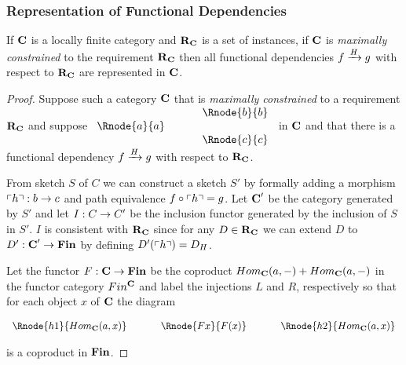 \documentclass[10pt,a4paper]{article}
\theoremstyle{remark}
\renewcommand{\term}[1]{\textit{#1}}  %
\begin{document}
\subsubsection{Representation of Functional Dependencies}
\begin{lemma}
If $\catc$ is a locally finite category and $\reqtc$ is a set of instances, if $\catc$ is 
\term{maximally constrained} to the requirement $\reqtc$ then
all functional dependencies $\fundep{H}{f}{g}$  with respect to $\reqtc$ are represented in $\catc$.
\end{lemma}
\begin{proof}
Suppose such a category  $\catc$  that  is 
\term{maximally constrained} to a requirement $\reqtc$ and suppose
$
\begin{array}{c p{0.5cm} c  }
             &&   \Rnode{b}{b} \\[0.01cm]
\Rnode{a}{a} &&                \\[0.01cm] 
             &&   \Rnode{c}{c}         
\end{array} 
$
in $\catc$ 
and that there is a functional dependency $\fundep{H}{f}{g}$ with respect to $\reqtc$.

From sketch $S$ of $C$ we can construct a sketch $S'$ by formally adding a morphism $\qq{h}: b \morph c$
and path equivalence $f \circ \qq{h} = g$. Let $\catcp$ be the category generated by $S'$ and
let $I: C \morph C'$ be the inclusion functor generated by the inclusion of $S$ in $S'$. 
$I$ is consistent with $\reqtc$ since for any $D \in \reqtc$ we can extend $D$ to $D' :\catcp \morph \Fin$ by defining $D'(\qq{h})=D_H$.

Let the functor $F: \catc \morph \Fin$ be the coproduct $Hom_{\catc}(a,-) + Hom_{\catc}(a,-)$
in the functor category $Fin^{\catc}$ and label the injections $L$ and $R$, respectively so that
for each object $x$ of $\catc$ the diagram
\begin{center}
$
\begin{array}{c p{0.5cm} c p{0.5cm} c  }
\Rnode{h1}{Hom_{\catc}(a,x)}  &&\Rnode{Fx}{F(x)}  &&   \Rnode{h2}{Hom_{\catc}(a,x)}       
\end{array} 
$
\end{center}
is a coproduct in $\Fin$.


\end{proof}
\end{document}
